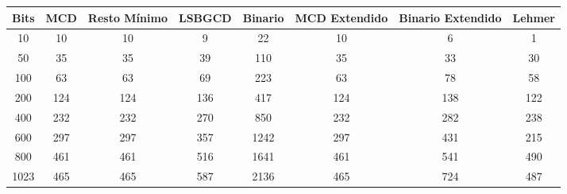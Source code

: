 \documentclass[11pt, conference]{IEEEtran}
\begin{document}
\begin{tabular}{|c|c|c|c|c|c|c|c|}
	\hline
	Bits & \textbf{MCD} & \textbf{Resto Mínimo} & \textbf{LSBGCD} & \textbf{Binario} & \textbf{MCD Extendido}& \textbf{Binario Extendido} & \textbf{Lehmer} \\	\hline
	10 & 10 & 10 & 9 & 22 & 10 & 6 & 1\\ \hline
	50 & 35  & 35 & 39 & 110 & 35 & 33 & 30\\ \hline
	100 & 63  & 63 & 69 & 223 & 63 & 78 & 58\\ \hline
	200 & 124 & 124 & 136 & 417 & 124 & 138 & 122\\ \hline
	400 & 232  & 232 & 270 & 850 & 232 & 282 & 238\\ \hline
	600 & 297 & 297 & 357 & 1242 & 297 & 431 & 215\\ \hline
	800 & 461 & 461 & 516 & 1641 & 461 & 541 & 490\\ \hline
	1023 & 465 & 465 & 587 & 2136 & 465 & 724 & 487\\
	\hline		
\end{tabular}
\end{document}
